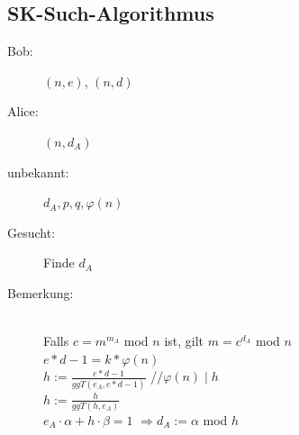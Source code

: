 \documentclass[landscape,twocolumn,a4paper]{article}
\newcommand{\Ra}{\Rightarrow}
\begin{document}
\subsection{SK-Such-Algorithmus}
\begin{description}
	\item[Bob:] $(n,e)$, $(n,d)$
	\item[Alice:] $(n,d_A)$
	\item[unbekannt:] $d_A,p,q,\varphi(n)$
	\item[Gesucht:] Finde $d_A$ 
	\item[Bemerkung:] \hfill \\
		Falls $c=m^{m_A}$ mod $n$ ist, gilt $m=c^{d_A}$ mod $n$ \\
		$e*d-1=k*\varphi(n)$ \\
		$h:=\frac{e*d-1}{ggT(e_A,e*d-1)}$ \hspace*{2cm}//$\varphi(n)\mid h$\\
		$h:=\frac{h}{ggT(h,e_A)}$ \\
		$e_A\cdot\alpha+h\cdot\beta=1 $ {\color{red}$\Ra d_A:=\alpha$ mod $h$}
\end{description}
\end{document}
